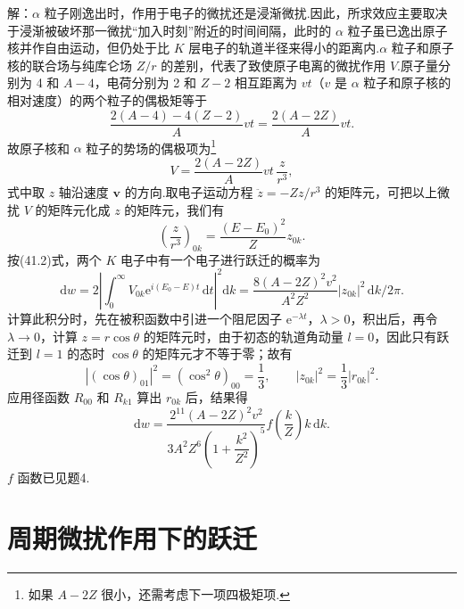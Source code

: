 \begin{xiti}
解：$\alpha$ 粒子刚逸出时，作用于电子的微扰还是浸渐微扰.因此，所求效应主要取决于浸渐被破坏那一微扰“加入时刻”附近的时间间隔，此时的 $\alpha$ 粒子虽已逸出原子核并作自由运动，但仍处于比 $K$ 层电子的轨道半径来得小的距离内.$\alpha$ 粒子和原子核的联合场与纯库仑场 $Z/r$ 的差别，代表了致使原子电离的微扰作用 $V$.原子量分别为 4 和 $A-4$，电荷分别为 2 和 $Z-2$ 相互距离为 $vt$（$v$ 是 $\alpha$ 粒子和原子核的相对速度）的两个粒子的偶极矩等于
\begin{equation*}
  \frac{2\left(A-4\right)-4\left(Z-2\right)}{A}vt=\frac{2\left(A-2Z\right)}{A}vt.
\end{equation*}
故原子核和 $\alpha$ 粒子的势场的偶极项为\footnote{如果 $A-2Z$ 很小，还需考虑下一项四极矩项.}
\begin{equation*}
  V=\frac{2\left(A-2Z\right)}{A}vt\,\frac{z}{r^3},
\end{equation*}
式中取 $z$ 轴沿速度 $\boldsymbol{v}$ 的方向.取电子运动方程 $\ddot{z}=-Zz/r^3$ 的矩阵元，可把以上微扰 $V$ 的矩阵元化成 $z$ 的矩阵元，我们有
\begin{equation*}
  \left(\frac{z}{r^3}\right)_{0k}=\frac{\left(E-E_0\right)^2}{Z}z_{0k}.
\end{equation*}
按(41.2)式，两个 $K$ 电子中有一个电子进行跃迁的概率为
\begin{equation*}
  \mathrm{d}w=2\left|\int_0^{\infty}V_{0k}\mathrm{e}^{i(E_0-E)t}\,\mathrm{d}t\right|^2
  \mathrm{d}k=\frac{8\left(A-2Z\right)^2v^2}{A^2Z^2}|z_{0k}|^2\,\mathrm{d}k/2\pi.
\end{equation*}
计算此积分时，先在被积函数中引进一个阻尼因子 $\mathrm{e}^{-\lambda t}$，$\lambda>0$，积出后，再令 $\lambda\to0$，计算 $z=r\cos\theta$ 的矩阵元时，由于初态的轨道角动量 $l=0$，因此只有跃迁到 $l=1$ 的态时 $\cos\theta$ 的矩阵元才不等于零；故有
\begin{equation*}
  \left|\left(\cos\theta\right)_{01}\right|^2
  =\left(\cos^2\theta\right)_{00}=\frac{1}{3},\qquad
  |z_{0k}|^2=\frac{1}{3}|r_{0k}|^2.
\end{equation*}
应用径函数 $R_{00}$ 和 $R_{k1}$ 算出 $r_{0k}$ 后，结果得
\begin{equation*}
  \mathrm{d}w=\frac{2^{11}\left(A-2Z\right)^2v^2}
  {3A^2Z^6\left(1+\dfrac{k^2}{Z^2}\right)^5}
  f\left(\frac{k}{Z}\right)k\,\mathrm{d}k.
\end{equation*}
$f$ 函数已见题4.

\end{xiti}

\section{周期微扰作用下的跃迁}

